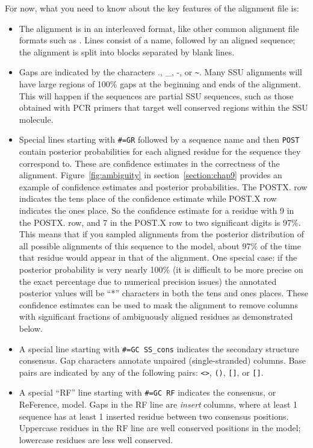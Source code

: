 For now, what you need to know about the key features of the alignment file is:
\begin{itemize}

\item The alignment is in an interleaved format, like other
  common alignment file formats such as .
  Lines consist of a name, followed by an aligned sequence;
  the alignment is split into blocks separated by blank lines.

\item Gaps are indicated by the characters ., \_, -, or \verb+~+.
  Many SSU alignments will have large regions of 100\% gaps at the
  beginning and ends of the alignment. 
  This will happen if the sequences are 
  partial SSU sequences, such as those  obtained with PCR
  primers that target well conserved regions within the SSU
  molecule.

\item Special lines starting with {\small\verb+#=GR+} followed by a
  sequence name and then {\small\verb+POST+} contain posterior
  probabilities for each aligned residue for the sequence they
  correspond to. 
  These are confidence estimates in the correctness of
  the alignment.  
  Figure~\ref{fig:ambiguity} in
  section~\ref{section:chap9} provides an example of confidence estimates
  and posterior probabilities. 
  The POSTX. row indicates the tens place of the
  confidence estimate while POST.X row indicates the ones place. So
  the confidence estimate for a residue with 9 in the POSTX. row, and
  7 in the POST.X row to two significant digits is 97\%. This means that
  if you sampled alignments from the posterior distribution of all
  possible alignments of this sequence to the model, about 97\% of the
  time that residue would appear in that of the alignment. One special
  case: if the posterior probability is very nearly 100\% (it is
  difficult to be more precise on the exact percentage due to
  numerical precision issues) the annotated posterior values will be
  ``*'' characters in both the tens and ones places. These confidence
  estimates can be used to mask the alignment to remove columns with
  significant fractions of ambiguously aligned residues as demonstrated
  below.

\item A special line starting with {\small\verb+#=GC SS_cons+}
  indicates the secondary structure consensus. Gap characters annotate
  unpaired (single-stranded) columns. Base pairs are indicated by any
  of the following pairs: \verb+<>+, \verb+()+, \verb+[]+, or
  \verb+[]+.

\item A special ``RF'' line starting with {\small\verb+#=GC RF+}
  indicates the consensus, or ReFerence, model. Gaps in the RF line
  are \emph{insert} columns, where at least 1 sequence has at least 1
  inserted residue between two consensus positions. Uppercase residues
  in the RF line are well conserved positions in the model; lowercase
  residues are less well conserved.
\end{itemize}

